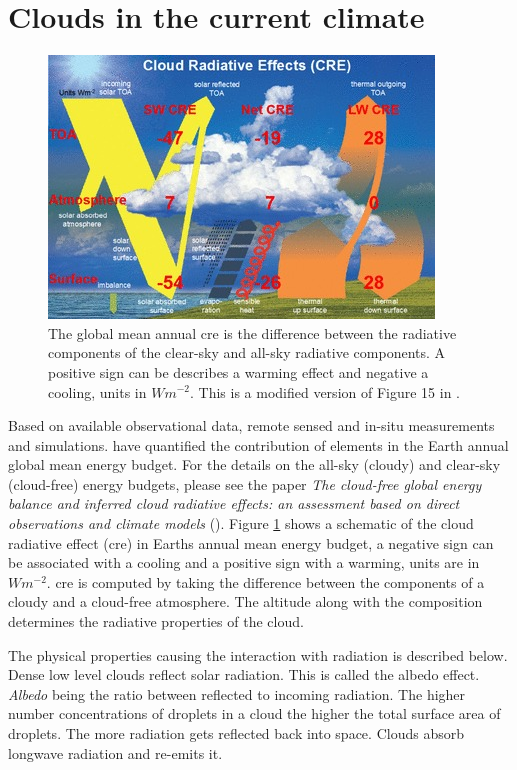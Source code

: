 \section{Clouds in the current climate} \label{sec:intro_cloud_current_climate}
\begin{figure}[h]
    \centering
    \includegraphics[scale = 7]{Chapter1_Intro/images/CRE_wild2019.jpg}
    \caption{The global mean annual \acrfull{cre} is the difference between the radiative components of the clear-sky and all-sky radiative components. A positive sign can be describes a warming effect and negative a cooling, units in $W m^{-2}$. This is a modified version of Figure 15 in \cite{Wild2019TheModels}.
    }
    \label{fig:cre}
\end{figure}
Based on available observational data, remote sensed and in-situ measurements and simulations. \citeauthor{Wild2019TheModels} have quantified the contribution of elements in the Earth annual global mean energy budget. For the details on the all-sky (cloudy) and clear-sky (cloud-free) energy budgets, please see the paper \textit{The cloud-free global energy balance and inferred cloud radiative effects: an assessment based on direct observations and climate models} (\cite{Wild2019TheModels}). Figure \ref{fig:cre} shows a schematic of the cloud radiative effect (\acrshort{cre}) in Earths annual mean energy budget, a negative sign can be associated with a cooling and a positive sign with a warming,  units are in $W m^{-2}$. \acrshort{cre} is computed by taking the difference between the components of a cloudy and a cloud-free atmosphere. The altitude along with the composition determines the radiative properties of the cloud. 

The physical properties causing the interaction with radiation is described below. Dense low level clouds reflect solar radiation. This is called the albedo effect. \textit{Albedo} being the ratio between reflected to incoming radiation. The higher number concentrations of droplets in a cloud the higher the total surface area of droplets. The more radiation gets reflected back into space. Clouds absorb longwave radiation and re-emits it.


